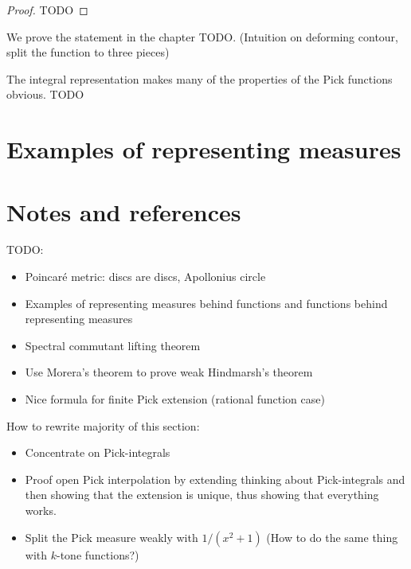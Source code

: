 \begin{proof}
TODO
\end{proof}

We prove the statement in the chapter TODO. (Intuition on deforming contour, split the function to three pieces)

The integral representation makes many of the properties of the Pick functions obvious. TODO

\section{Examples of representing measures}

\section{Notes and references}

TODO:
\begin{itemize}
	\item Poincaré metric: discs are discs, Apollonius circle
	\item Examples of representing measures behind functions and functions behind representing measures
	\item Spectral commutant lifting theorem
	\item Use Morera's theorem to prove weak Hindmarsh's theorem
	\item Nice formula for finite Pick extension (rational function case)
\end{itemize}


How to rewrite majority of this section:
\begin{itemize}
	\item Concentrate on Pick-integrals
	\item Proof open Pick interpolation by extending thinking about Pick-integrals and then showing that the extension is unique, thus showing that everything works.
	\item Split the Pick measure weakly with $1/(x^2 + 1)$ (How to do the same thing with $k$-tone functions?)
\end{itemize}

